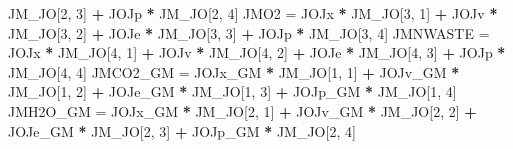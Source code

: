 \documentclass[]{article}
\newenvironment{Shaded}{\begin{snugshade}}{\end{snugshade}}
\newcommand{\DecValTok}[1]{\textcolor[rgb]{0.00,0.00,0.81}{#1}}
\newcommand{\StringTok}[1]{\textcolor[rgb]{0.31,0.60,0.02}{#1}}
\newcommand{\OperatorTok}[1]{\textcolor[rgb]{0.81,0.36,0.00}{\textbf{#1}}}
\newcommand{\NormalTok}[1]{#1}
\begin{document}
\begin{Shaded}
\begin{Highlighting}[]
{{{\StringTok{        }\NormalTok{JM_JO[}\DecValTok{2}\NormalTok{, }\DecValTok{3}\NormalTok{] }\OperatorTok{+}\StringTok{ }\NormalTok{JOJp }\OperatorTok{*}\StringTok{ }\NormalTok{JM_JO[}\DecValTok{2}\NormalTok{, }\DecValTok{4}\NormalTok{]}
\NormalTok{    JMO2 =}\StringTok{ }\NormalTok{JOJx }\OperatorTok{*}\StringTok{ }\NormalTok{JM_JO[}\DecValTok{3}\NormalTok{, }\DecValTok{1}\NormalTok{] }\OperatorTok{+}\StringTok{ }\NormalTok{JOJv }\OperatorTok{*}\StringTok{ }\NormalTok{JM_JO[}\DecValTok{3}\NormalTok{, }\DecValTok{2}\NormalTok{] }\OperatorTok{+}\StringTok{ }\NormalTok{JOJe }\OperatorTok{*}\StringTok{ }\NormalTok{JM_JO[}\DecValTok{3}\NormalTok{, }
        \DecValTok{3}\NormalTok{] }\OperatorTok{+}\StringTok{ }\NormalTok{JOJp }\OperatorTok{*}\StringTok{ }\NormalTok{JM_JO[}\DecValTok{3}\NormalTok{, }\DecValTok{4}\NormalTok{]}
\NormalTok{    JMNWASTE =}\StringTok{ }\NormalTok{JOJx }\OperatorTok{*}\StringTok{ }\NormalTok{JM_JO[}\DecValTok{4}\NormalTok{, }\DecValTok{1}\NormalTok{] }\OperatorTok{+}\StringTok{ }\NormalTok{JOJv }\OperatorTok{*}\StringTok{ }\NormalTok{JM_JO[}\DecValTok{4}\NormalTok{, }\DecValTok{2}\NormalTok{] }\OperatorTok{+}\StringTok{ }\NormalTok{JOJe }\OperatorTok{*}\StringTok{ }
\StringTok{        }\NormalTok{JM_JO[}\DecValTok{4}\NormalTok{, }\DecValTok{3}\NormalTok{] }\OperatorTok{+}\StringTok{ }\NormalTok{JOJp }\OperatorTok{*}\StringTok{ }\NormalTok{JM_JO[}\DecValTok{4}\NormalTok{, }\DecValTok{4}\NormalTok{]}
\NormalTok{    JMCO2_GM =}\StringTok{ }\NormalTok{JOJx_GM }\OperatorTok{*}\StringTok{ }\NormalTok{JM_JO[}\DecValTok{1}\NormalTok{, }\DecValTok{1}\NormalTok{] }\OperatorTok{+}\StringTok{ }\NormalTok{JOJv_GM }\OperatorTok{*}\StringTok{ }\NormalTok{JM_JO[}\DecValTok{1}\NormalTok{, }\DecValTok{2}\NormalTok{] }\OperatorTok{+}\StringTok{ }
\StringTok{        }\NormalTok{JOJe_GM }\OperatorTok{*}\StringTok{ }\NormalTok{JM_JO[}\DecValTok{1}\NormalTok{, }\DecValTok{3}\NormalTok{] }\OperatorTok{+}\StringTok{ }\NormalTok{JOJp_GM }\OperatorTok{*}\StringTok{ }\NormalTok{JM_JO[}\DecValTok{1}\NormalTok{, }\DecValTok{4}\NormalTok{]}
\NormalTok{    JMH2O_GM =}\StringTok{ }\NormalTok{JOJx_GM }\OperatorTok{*}\StringTok{ }\NormalTok{JM_JO[}\DecValTok{2}\NormalTok{, }\DecValTok{1}\NormalTok{] }\OperatorTok{+}\StringTok{ }\NormalTok{JOJv_GM }\OperatorTok{*}\StringTok{ }\NormalTok{JM_JO[}\DecValTok{2}\NormalTok{, }\DecValTok{2}\NormalTok{] }\OperatorTok{+}\StringTok{ }
\StringTok{        }\NormalTok{JOJe_GM }\OperatorTok{*}\StringTok{ }\NormalTok{JM_JO[}\DecValTok{2}\NormalTok{, }\DecValTok{3}\NormalTok{] }\OperatorTok{+}\StringTok{ }\NormalTok{JOJp_GM }\OperatorTok{*}\StringTok{ }\NormalTok{JM_JO[}\DecValTok{2}\NormalTok{, }\DecValTok{4}\NormalTok{]}
}}}
\end{Highlighting}
\end{Shaded}
\end{document}
